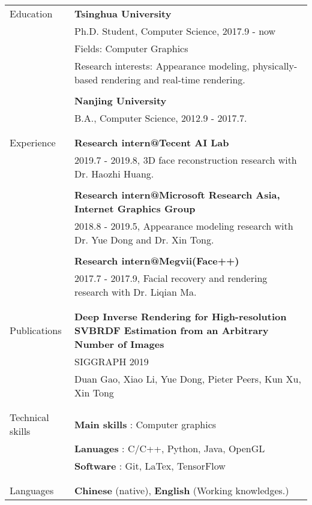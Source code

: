 \documentclass[letterpaper,11pt,oneside]{article}
\begin{document}
\noindent \begin{tabular}{@{} l l}
 \Large{Education}    & \textbf{Tsinghua University} \\
     & Ph.D. Student, Computer Science, 2017.9 - now \\
     & Fields:  Computer Graphics\\
      & \parbox{5.0in}{ Research interests: Appearance modeling, physically-based rendering and real-time rendering.} \\
     & \\
     & \textbf{Nanjing University} \\
     & B.A., Computer Science, 2012.9 - 2017.7. \\
     & \\
     & \\
 \Large{Experience}
 	& \textbf{Research intern@Tecent AI Lab} \\
	& \parbox{5.0in}{ 2019.7 - 2019.8, 3D face reconstruction research with Dr. Haozhi Huang.}\\
 	& \\    
 	& \textbf{Research intern@Microsoft Research Asia, Internet Graphics Group} \\
    & \parbox{5.0in}{ 2018.8 - 2019.5, Appearance modeling research with Dr. Yue Dong and Dr. Xin Tong.}\\
    & \\
    & \textbf{Research intern@Megvii(Face++)} \\
    & \parbox{5.0in}{2017.7 - 2017.9, Facial recovery and rendering research with Dr. Liqian Ma.}\\
    & \\
     & \\
 \Large{Publications} 
     & \parbox{5.0in}{\textbf{Deep Inverse Rendering for High-resolution SVBRDF Estimation from an Arbitrary Number of Images}} \\
     & \parbox{5.0in}{SIGGRAPH 2019} \\
     & \parbox{5.0in}{Duan Gao, Xiao Li, Yue Dong, Pieter Peers, Kun Xu, Xin Tong} \\
     & \\
  & \\
  
 \Large{Technical skills} & \textbf{Main skills \hspace{0.2em}}:  Computer graphics  \\
 & \textbf{Lanuages   \hspace{0.7em} }:  C/C++, Python, Java, OpenGL \\
 & \textbf{Software  \hspace{1em} }:  Git, LaTex, TensorFlow \\
 & \\  
 & \\  
 \Large{Languages}   & \textbf{Chinese} (native), \textbf{English} (Working knowledges.) \\
\end{tabular}
\end{document}
